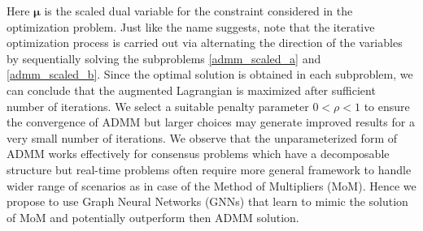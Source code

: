 \documentclass[lettersize,journal]{IEEEtran}
\begin{document}
Here $\bm{\mu}$ is the scaled dual variable for the constraint considered in the optimization problem. Just like the name suggests, note that the iterative optimization process is carried out via alternating the direction of the variables by sequentially solving the subproblems \eqref{admm_scaled_a} and \eqref{admm_scaled_b}. Since the optimal solution is obtained in each subproblem, we can conclude that the augmented Lagrangian is maximized after sufficient number of iterations. We select a suitable penalty parameter $0 < \rho < 1$ to ensure the convergence of ADMM but larger choices may generate improved results for a very small number of iterations. We observe that the unparameterized form of ADMM works effectively for consensus problems which have a decomposable structure but real-time problems often require more general framework to handle wider range of scenarios as in case of the Method of Multipliers (MoM). Hence we propose to use Graph Neural Networks (GNNs) that learn to mimic the solution of MoM and potentially outperform then ADMM solution.
 
\end{document}
